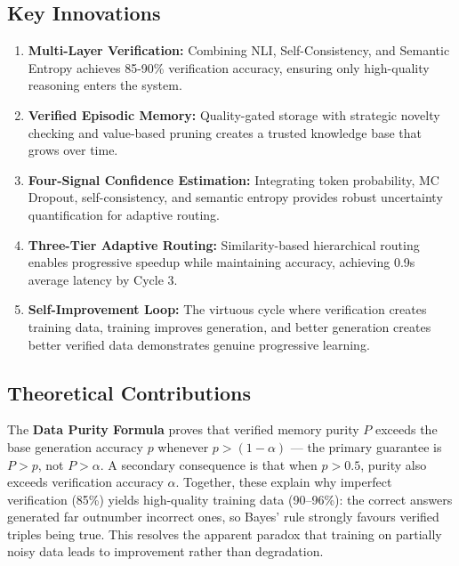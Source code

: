 \documentclass[12pt,a4paper]{article}
\theoremstyle{definition}
\begin{document}
\subsection{Key Innovations}

\begin{enumerate}
    \item \textbf{Multi-Layer Verification:} Combining NLI, Self-Consistency, and Semantic Entropy achieves 85-90\% verification accuracy, ensuring only high-quality reasoning enters the system.
    
    \item \textbf{Verified Episodic Memory:} Quality-gated storage with strategic novelty checking and value-based pruning creates a trusted knowledge base that grows over time.
    
    \item \textbf{Four-Signal Confidence Estimation:} Integrating token probability, MC Dropout, self-consistency, and semantic entropy provides robust uncertainty quantification for adaptive routing.
    
    \item \textbf{Three-Tier Adaptive Routing:} Similarity-based hierarchical routing enables progressive speedup while maintaining accuracy, achieving 0.9s average latency by Cycle 3.
    
    \item \textbf{Self-Improvement Loop:} The virtuous cycle where verification creates training data, training improves generation, and better generation creates better verified data demonstrates genuine progressive learning.
\end{enumerate}

\subsection{Theoretical Contributions}

The \textbf{Data Purity Formula} proves that verified memory purity $P$ exceeds the base generation accuracy $p$ whenever $p > (1-\alpha)$ — the primary guarantee is $P > p$, not $P > \alpha$. A secondary consequence is that when $p > 0.5$, purity also exceeds verification accuracy $\alpha$. Together, these explain why imperfect verification (85\%) yields high-quality training data (90--96\%): the correct answers generated far outnumber incorrect ones, so Bayes' rule strongly favours verified triples being true. This resolves the apparent paradox that training on partially noisy data leads to improvement rather than degradation.
\end{document}
